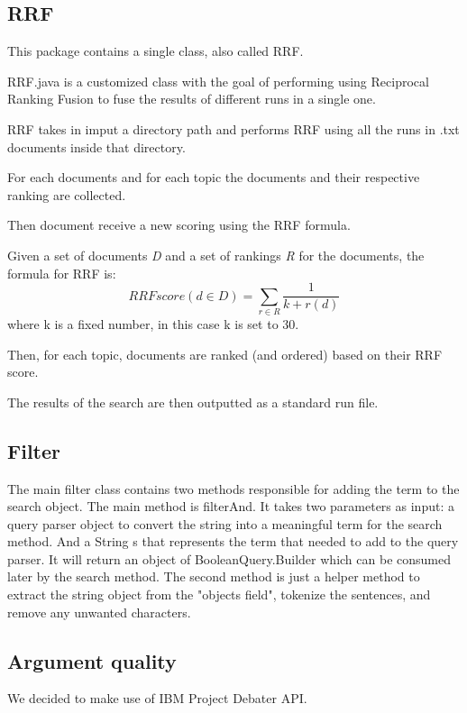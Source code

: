 \subsection{RRF}
  
      This package contains a single class, also called RRF.
        
        RRF.java is a customized class with the goal of performing using Reciprocal Ranking Fusion \citep{RRF} to fuse the results of different runs in a single one.
        
        RRF takes in imput a directory path and performs RRF using all the runs in .txt documents inside that directory.
        
        For each documents and for each topic the documents and their respective ranking are collected.
        
        Then document receive a new scoring using the RRF formula.
        
        Given a set of documents \textit{D} and a set of rankings \textit{R} for the documents, the formula for RRF is:
        $$RRFscore(d \in D)=\sum_{r \in R}^{}\frac{1}{k+r(d)}$$
        where k is a fixed number, in this case k is set to 30.
        
        Then, for each topic, documents are ranked (and ordered) based on their RRF score.
        
        The results of the search are then outputted as a standard run file.
\subsection{Filter}
 
    The main filter class contains two methods responsible for adding the term to the search object. The main method is filterAnd. It takes two parameters as input: a query parser object to convert the string into a meaningful term for the search method. And a String s that represents the term that needed to add to the query parser. It will return an object of BooleanQuery.Builder which can be consumed later by the search method. The second method is just a helper method to extract the string object from the "objects field", tokenize the sentences, and remove any unwanted characters.

\subsection{Argument quality}
  \label{subsec:Argument quality}
  We decided to make use of IBM Project Debater API.
  
